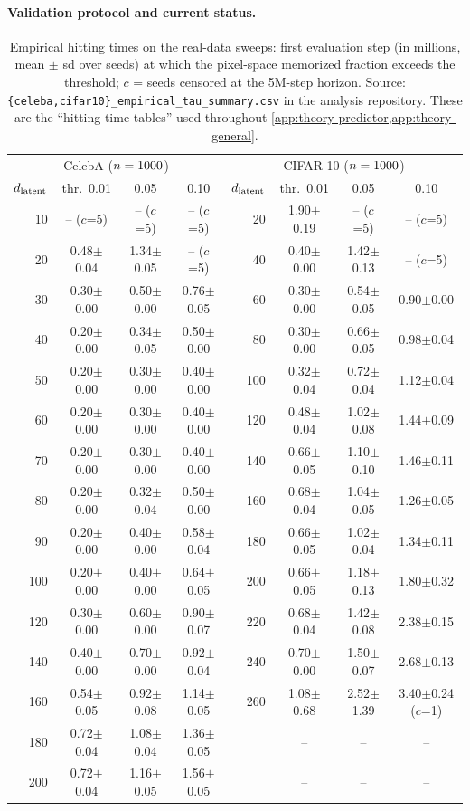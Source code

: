 \paragraph{Validation protocol and current status.}
\begin{table}[t]\centering\small
\caption{Empirical hitting times on the real-data sweeps: first evaluation step (in millions, mean $\pm$ sd over seeds) at which the pixel-space memorized fraction exceeds the threshold; $c$ = seeds censored at the 5M-step horizon. Source: \texttt{\{celeba,cifar10\}\_empirical\_tau\_summary.csv} in the analysis repository. These are the ``hitting-time tables'' used throughout \cref{app:theory-predictor,app:theory-general}.}
\label{tab:hitting-times-real}
\begin{tabular}{rccc|rccc}\toprule
\multicolumn{4}{c|}{CelebA ($n=1000$)} & \multicolumn{4}{c}{CIFAR-10 ($n=1000$)}\\
$d_{\mathrm{latent}}$ & thr.\ 0.01 & 0.05 & 0.10 & $d_{\mathrm{latent}}$ & thr.\ 0.01 & 0.05 & 0.10\\\midrule
10 & -- ($c$=5) & -- ($c$=5) & -- ($c$=5) & 20 & 1.90$\pm$0.19 & -- ($c$=5) & -- ($c$=5)\\
20 & 0.48$\pm$0.04 & 1.34$\pm$0.05 & -- ($c$=5) & 40 & 0.40$\pm$0.00 & 1.42$\pm$0.13 & -- ($c$=5)\\
30 & 0.30$\pm$0.00 & 0.50$\pm$0.00 & 0.76$\pm$0.05 & 60 & 0.30$\pm$0.00 & 0.54$\pm$0.05 & 0.90$\pm$0.00\\
40 & 0.20$\pm$0.00 & 0.34$\pm$0.05 & 0.50$\pm$0.00 & 80 & 0.30$\pm$0.00 & 0.66$\pm$0.05 & 0.98$\pm$0.04\\
50 & 0.20$\pm$0.00 & 0.30$\pm$0.00 & 0.40$\pm$0.00 & 100 & 0.32$\pm$0.04 & 0.72$\pm$0.04 & 1.12$\pm$0.04\\
60 & 0.20$\pm$0.00 & 0.30$\pm$0.00 & 0.40$\pm$0.00 & 120 & 0.48$\pm$0.04 & 1.02$\pm$0.08 & 1.44$\pm$0.09\\
70 & 0.20$\pm$0.00 & 0.30$\pm$0.00 & 0.40$\pm$0.00 & 140 & 0.66$\pm$0.05 & 1.10$\pm$0.10 & 1.46$\pm$0.11\\
80 & 0.20$\pm$0.00 & 0.32$\pm$0.04 & 0.50$\pm$0.00 & 160 & 0.68$\pm$0.04 & 1.04$\pm$0.05 & 1.26$\pm$0.05\\
90 & 0.20$\pm$0.00 & 0.40$\pm$0.00 & 0.58$\pm$0.04 & 180 & 0.66$\pm$0.05 & 1.02$\pm$0.04 & 1.34$\pm$0.11\\
100 & 0.20$\pm$0.00 & 0.40$\pm$0.00 & 0.64$\pm$0.05 & 200 & 0.66$\pm$0.05 & 1.18$\pm$0.13 & 1.80$\pm$0.32\\
120 & 0.30$\pm$0.00 & 0.60$\pm$0.00 & 0.90$\pm$0.07 & 220 & 0.68$\pm$0.04 & 1.42$\pm$0.08 & 2.38$\pm$0.15\\
140 & 0.40$\pm$0.00 & 0.70$\pm$0.00 & 0.92$\pm$0.04 & 240 & 0.70$\pm$0.00 & 1.50$\pm$0.07 & 2.68$\pm$0.13\\
160 & 0.54$\pm$0.05 & 0.92$\pm$0.08 & 1.14$\pm$0.05 & 260 & 1.08$\pm$0.68 & 2.52$\pm$1.39 & 3.40$\pm$0.24 ($c$=1)\\
180 & 0.72$\pm$0.04 & 1.08$\pm$0.04 & 1.36$\pm$0.05 &  & -- & -- & --\\
200 & 0.72$\pm$0.04 & 1.16$\pm$0.05 & 1.56$\pm$0.05 &  & -- & -- & --\\
\bottomrule\end{tabular}\end{table}

